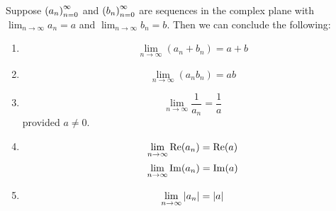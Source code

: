 \begin{theorem}
Suppose $\seq{a}$ and $\seq{b}$ are sequences in the complex plane with $\lim_{n\to\infty} a_n =a$ and $\lim_{n\to\infty} b_n = b$. Then we can conclude the following:
\begin{enumerate}
\item $$\lim_{n\to\infty} (a_n+b_n) = a+b$$
\item $$\lim_{n\to\infty} (a_nb_n) = ab$$
\item $$\lim_{n\to\infty} \frac{1}{a_n} = \frac{1}{a}$$ provided $a \neq 0$.
\item $$\lim_{n\to\infty} \operatorname{Re}({a_n}) = \operatorname{Re}({a})$$\newline $$\lim_{n\to\infty} \operatorname{Im}({a_n}) = \operatorname{Im}({a})$$ 
\item $$\lim_{n\to\infty} \left\lvert a_n \right\rvert = \left\lvert a \right\rvert$$
\end{enumerate}
\end{theorem}
